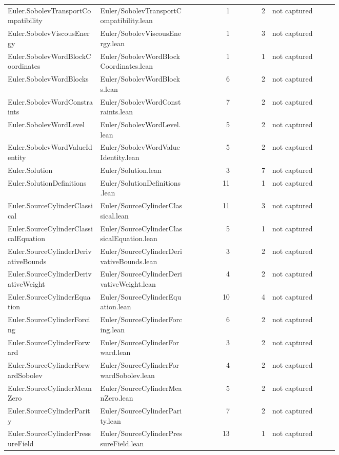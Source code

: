 \documentclass[10pt]{article}
\begin{document}
\begin{longtable}{p{0.28\linewidth}p{0.27\linewidth}r r p{0.20\linewidth}}
Euler.SobolevTransportCompatibility & Euler/SobolevTransportCompatibility.lean & 1 & 2 & not captured\\
Euler.SobolevViscousEnergy & Euler/SobolevViscousEnergy.lean & 1 & 3 & not captured\\
Euler.SobolevWordBlockCoordinates & Euler/SobolevWordBlockCoordinates.lean & 1 & 1 & not captured\\
Euler.SobolevWordBlocks & Euler/SobolevWordBlocks.lean & 6 & 2 & not captured\\
Euler.SobolevWordConstraints & Euler/SobolevWordConstraints.lean & 7 & 2 & not captured\\
Euler.SobolevWordLevel & Euler/SobolevWordLevel.lean & 5 & 2 & not captured\\
Euler.SobolevWordValueIdentity & Euler/SobolevWordValueIdentity.lean & 5 & 2 & not captured\\
Euler.Solution & Euler/Solution.lean & 3 & 7 & not captured\\
Euler.SolutionDefinitions & Euler/SolutionDefinitions.lean & 11 & 1 & not captured\\
Euler.SourceCylinderClassical & Euler/SourceCylinderClassical.lean & 11 & 3 & not captured\\
Euler.SourceCylinderClassicalEquation & Euler/SourceCylinderClassicalEquation.lean & 5 & 1 & not captured\\
Euler.SourceCylinderDerivativeBounds & Euler/SourceCylinderDerivativeBounds.lean & 3 & 2 & not captured\\
Euler.SourceCylinderDerivativeWeight & Euler/SourceCylinderDerivativeWeight.lean & 4 & 2 & not captured\\
Euler.SourceCylinderEquation & Euler/SourceCylinderEquation.lean & 10 & 4 & not captured\\
Euler.SourceCylinderForcing & Euler/SourceCylinderForcing.lean & 6 & 2 & not captured\\
Euler.SourceCylinderForward & Euler/SourceCylinderForward.lean & 3 & 2 & not captured\\
Euler.SourceCylinderForwardSobolev & Euler/SourceCylinderForwardSobolev.lean & 4 & 2 & not captured\\
Euler.SourceCylinderMeanZero & Euler/SourceCylinderMeanZero.lean & 5 & 2 & not captured\\
Euler.SourceCylinderParity & Euler/SourceCylinderParity.lean & 7 & 2 & not captured\\
Euler.SourceCylinderPressureField & Euler/SourceCylinderPressureField.lean & 13 & 1 & not captured\\

\end{longtable}
\end{document}

